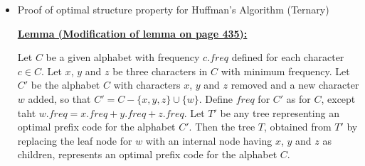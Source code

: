 \documentclass[12pt]{article}
\begin{document}
\begin{enumerate}[1.]
\begin{mdframed}
\begin{itemize}
\begin{proof}
            \begin{align}
            B(T) - B(T') &= \sum\limits_{c \in C} c.freq \cdot d_T(c) - \sum\limits_{c \in C} c.freq \cdot d_{T'}(c)\\
            &= x.freq \cdot d_T(x) + a.freq \cdot d_T(a) - x.freq \cdot d_{T'}(x) - a.freq \cdot d_{T'}(a)\\
            &= x.freq \cdot d_T(x) + a.freq \cdot d_T(a) _ x.freq \cdot d_T(a) - a.freq \cdot d_T(x)\\
            &= (a.freq - x.freq)(d_T(a) - d_T(x))\\
            &\geq 0
            \end{align}

            \bigskip

            because both $a.freq - x.freq$ and $d_T(a) - d_T(x)$ are nonnegative. More specifically,
            $a.freq - x.freq$ is non-negative because $x$ is a minimum-frequency leaf, and $d_T(a) - d_T(x)$
            is non-negative because $a$ is leaf of maximum depth in $T$. Similarly, exchanging
            $y$ and $b$ does not increase the cost, and so $B(T') - B(T'')$ is non-negative.
            Therefore $B(T'') \leq B(T)$, and since $T$ is optimal we have $B(T) \leq B(T'')$,
            which implies $B(T) = B(T'')$. Thus $T''$ is an optimal tree in which $x$ and $y$
            appear as sibling leaves of maximum depth, from which the lemma follows.

            \end{proof}


            \item Proof of optimal structure property for Huffman's Algorithm (Ternary)

            \bigskip

            \underline{\textbf{Lemma (Modification of lemma on page 435):}}

            \bigskip

            Let $C$ be a given alphabet with frequency $c.freq$ defined for each
            character $c \in C$. Let $x$, $y$ and $z$ be three characters in $C$ with minimum frequency.
            Let $C'$ be the alphabet $C$ with characters $x$, $y$ and $z$ removed and a new character
            $w$ added, so that $C' = C - \{x,y,z\} \cup \{w\}$. Define $freq$ for $C'$ as for $C$, except taht
            $w.freq = x.freq + y.freq + z.freq$. Let $T'$ be any tree representing an optimal prefix code
            for the alphabet $C'$. Then the tree $T$, obtained from $T'$ by replacing the leaf node
            for $w$ with an internal node having $x$, $y$ and $z$ as children, represents an optimal prefix
            code for the alphabet $C$.


\end{itemize}
\end{mdframed}
\end{enumerate}
\end{document}
